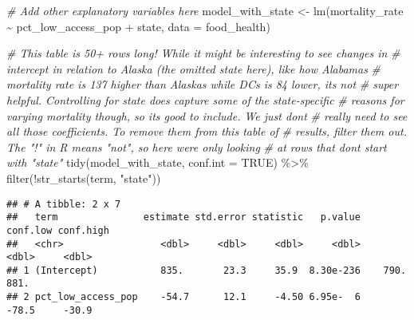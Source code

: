 \documentclass[
]{article}
\newenvironment{Shaded}{\begin{snugshade}}{\end{snugshade}}
\newcommand{\AttributeTok}[1]{\textcolor[rgb]{0.77,0.63,0.00}{#1}}
\newcommand{\CommentTok}[1]{\textcolor[rgb]{0.56,0.35,0.01}{\textit{#1}}}
\newcommand{\ConstantTok}[1]{\textcolor[rgb]{0.00,0.00,0.00}{#1}}
\newcommand{\FunctionTok}[1]{\textcolor[rgb]{0.00,0.00,0.00}{#1}}
\newcommand{\NormalTok}[1]{#1}
\newcommand{\OtherTok}[1]{\textcolor[rgb]{0.56,0.35,0.01}{#1}}
\newcommand{\SpecialCharTok}[1]{\textcolor[rgb]{0.00,0.00,0.00}{#1}}
\newcommand{\StringTok}[1]{\textcolor[rgb]{0.31,0.60,0.02}{#1}}
\begin{document}
\begin{Shaded}
\begin{Highlighting}[]
\CommentTok{\# Add other explanatory variables here}
\NormalTok{model\_with\_state }\OtherTok{\textless{}{-}} \FunctionTok{lm}\NormalTok{(mortality\_rate }\SpecialCharTok{\textasciitilde{}}\NormalTok{ pct\_low\_access\_pop }\SpecialCharTok{+}\NormalTok{ state,}
                       \AttributeTok{data =}\NormalTok{ food\_health)}

\CommentTok{\# This table is 50+ rows long! While it might be interesting to see changes in}
\CommentTok{\# intercept in relation to Alaska (the omitted state here), like how Alabama\textquotesingle{}s}
\CommentTok{\# mortality rate is 137 higher than Alaska\textquotesingle{}s while DC\textquotesingle{}s is 84 lower, it\textquotesingle{}s not}
\CommentTok{\# super helpful. Controlling for state does capture some of the state{-}specific}
\CommentTok{\# reasons for varying mortality though, so it\textquotesingle{}s good to include. We just don\textquotesingle{}t}
\CommentTok{\# really need to see all those coefficients. To remove them from this table of}
\CommentTok{\# results, filter them out. The "!" in R means "not", so here we\textquotesingle{}re only looking}
\CommentTok{\# at rows that don\textquotesingle{}t start with "state"}
\FunctionTok{tidy}\NormalTok{(model\_with\_state, }\AttributeTok{conf.int =} \ConstantTok{TRUE}\NormalTok{) }\SpecialCharTok{\%\textgreater{}\%} 
  \FunctionTok{filter}\NormalTok{(}\SpecialCharTok{!}\FunctionTok{str\_starts}\NormalTok{(term, }\StringTok{"state"}\NormalTok{))}
\end{Highlighting}
\end{Shaded}

\begin{verbatim}
## # A tibble: 2 x 7
##   term               estimate std.error statistic   p.value conf.low conf.high
##   <chr>                 <dbl>     <dbl>     <dbl>     <dbl>    <dbl>     <dbl>
## 1 (Intercept)           835.       23.3     35.9  8.30e-236    790.      881. 
## 2 pct_low_access_pop    -54.7      12.1     -4.50 6.95e-  6    -78.5     -30.9
\end{verbatim}
\end{document}
